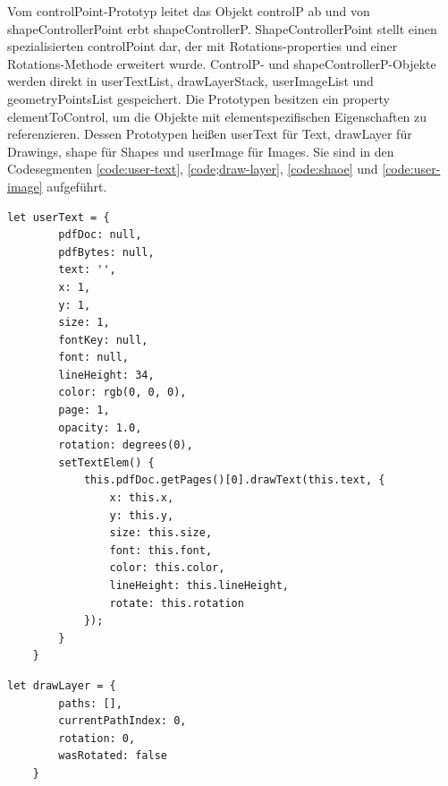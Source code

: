Vom controlPoint-Prototyp leitet das Objekt controlP ab und von shapeControllerPoint erbt shapeControllerP. ShapeControllerPoint stellt einen spezialisierten controlPoint dar, der mit Rotations-properties und einer Rotations-Methode erweitert wurde. ControlP- und shapeControllerP-Objekte werden direkt in userTextList, drawLayerStack, userImageList und geometryPointsList gespeichert. Die Prototypen besitzen ein property elementToControl, um die Objekte mit elementspezifischen Eigenschaften zu referenzieren. Dessen Prototypen heißen userText für Text, drawLayer für Drawings, shape für Shapes und userImage für Images. Sie sind in den Codesegmenten \ref{code:user-text}, \ref{code;draw-layer}, \ref{code:shaoe} und \ref{code:user-image} aufgeführt.

\begin{lstlisting}[style=ES6, caption={Prototyp-Objekt für die textspezifischen Eigenschaften}, label=code:user-text, breaklines=true]
	let userText = {
		pdfDoc: null,
		pdfBytes: null,
		text: '',
		x: 1,
		y: 1,
		size: 1,
		fontKey: null,
		font: null,
		lineHeight: 34,
		color: rgb(0, 0, 0),
		page: 1,
		opacity: 1.0,
		rotation: degrees(0),
		setTextElem() {
			this.pdfDoc.getPages()[0].drawText(this.text, {
				x: this.x,
				y: this.y,
				size: this.size,
				font: this.font,
				color: this.color,
				lineHeight: this.lineHeight,
				rotate: this.rotation
			});
		}
	}
\end{lstlisting}

\begin{lstlisting}[style=ES6, caption={Prototyp-Objekt für die drawingspezifischen Eigenschaften}, label=code:draw-layer, breaklines=true]
	let drawLayer = {
		paths: [],
		currentPathIndex: 0, 
		rotation: 0,
		wasRotated: false
	}
\end{lstlisting}

